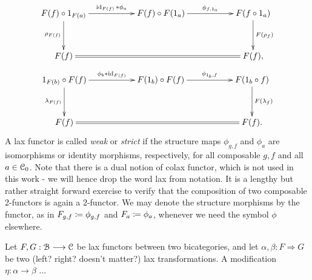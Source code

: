 \begin{defn}
\begin{gather*}
      \end{gather*}
      \begin{gather*}
        \xymatrix@C+3em@R+1em{
          F(f) \circ 1_{F(a)}
            \ar[r]^-{\id_{F(f)} \ast \phi_a}
            \ar[d]_{\rho_{F(f)}}
          &
          F(f) \circ F(1_a)
            \ar[r]^-{\phi_{f,1_a}}
          &
          F(f \circ 1_a)
            \ar[d]^{F(\rho_f)}
          \\
          F(f)
            \ar@{=}[rr]
          &
          &
          F(f),
        }
      \end{gather*}
      \begin{gather*}
        \xymatrix@C+3em@R+1em{
          1_{F(b)} \circ F(f)
            \ar[r]^-{\phi_b \ast \id_{F(f)}}
            \ar[d]_{\lambda_{F(f)}}
          &
          F(1_b) \circ F(f)
            \ar[r]^-{\phi_{1_b,f}}
          &
          F(1_b \circ f)
            \ar[d]^{F(\lambda_f)}
          \\
          F(f)
            \ar@{=}[rr]
          &
          &
          F(f).
         }
      \end{gather*}
      A lax functor is called \emph{weak} or \emph{strict} if the structure maps $\phi_{g,f}$ and $\phi_a$ are isomorphisms or identity morphisms, respectively, for all composable $g,f$ and all $a \in \mathcal{C}_0$. 
      Note that there is a dual notion of colax functor, which is not used in this work - we will hence drop the word lax from notation. 
      It is a lengthy but rather straight forward exercise to verify that the composition of two composable 2-functors is again a 2-functor. 
      We may denote the structure morphisms by the functor, as in $F_{g,f} \coloneqq \phi_{g,f}$ and $F_a \coloneqq \phi_a$, whenever we need the symbol $\phi$ elsewhere.
    \end{defn}

    \begin{defn}\label{def_modification}
    Let $F,G: \mathcal{B} \longrightarrow \mathcal{C}$ be lax functors between two bicategories, and let $\alpha,\beta: F \Rightarrow G$ be two (left? right? doesn't matter?) lax transformations. A modification $\eta: \alpha \to \beta$ ...
    \end{defn}

